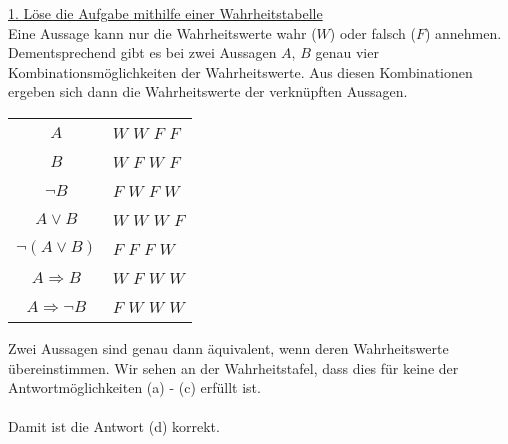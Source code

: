 \underline{1. Löse die Aufgabe mithilfe einer Wahrheitstabelle}\\
Eine Aussage kann nur die Wahrheitswerte wahr ($ W $) oder falsch ($ F $) annehmen.
Dementsprechend gibt es bei zwei Aussagen $ A $, $ B $ genau vier Kombinationsmöglichkeiten der Wahrheitswerte.
Aus diesen Kombinationen ergeben sich dann die Wahrheitswerte der verknüpften Aussagen.
\begin{center}
	\begin{tabular}{cllll}
		\hline
		\multicolumn{1}{c|}{$A$} & \multicolumn{4}{l}{$W$ $W$ $F$ $F$} \\
		\multicolumn{1}{c|}{$B$} & \multicolumn{4}{l}{$W$ $F$ $W$ $F$} \\ 
		\multicolumn{1}{c|}{$\neg B$} & \multicolumn{4}{l}{$F$ $W$ $F$ $W$} \\ 
		\hline
		\multicolumn{1}{c|}{$ A \vee B$} & \multicolumn{4}{l}{$W$ $W$ $W$ $F$} \\ 
		\multicolumn{1}{c|}{$ \neg(A \vee B)$} & \multicolumn{4}{l}{$F$ $F$ $F$ $W$} \\ 
		\hline
		\multicolumn{1}{c|}{$ A \Rightarrow B$} & \multicolumn{4}{l}{$W$ $F$ $W$ $W$} \\ 
		\multicolumn{1}{c|}{$ A \Rightarrow  \neg B$} & \multicolumn{4}{l}{$F$ $W$ $W$ $W$} \\ 
		\hline
	\end{tabular}
\end{center}
Zwei Aussagen sind genau dann äquivalent, wenn deren Wahrheitswerte übereinstimmen. Wir sehen an der Wahrheitstafel, dass dies für keine der Antwortmöglichkeiten (a) - (c) erfüllt ist.\\
\\
Damit ist die Antwort (d) korrekt.


\newpage

